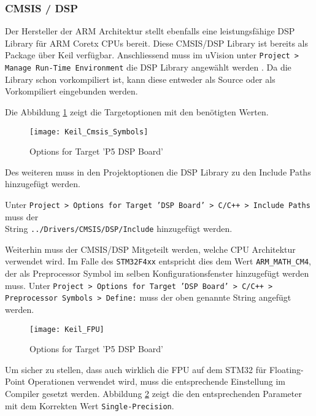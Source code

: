 \subsubsection{CMSIS / DSP}
\label{sec:CMSISDSP}

Der Hersteller der ARM Architektur stellt ebenfalls eine leistungsfähige DSP Library für ARM Coretx CPUs bereit.
Diese CMSIS/DSP Library ist bereits als Package über Keil verfügbar.
Anschliessend muss im uVision unter \texttt{Project > Manage Run-Time Environment} die DSP Library angewählt werden \cite{enable-cmsis-dsp-lib}.
Da die Library schon vorkompiliert ist, kann diese entweder als Source oder als Vorkompiliert eingebunden werden.

Die Abbildung \ref{pic:Keil_Cmsis_Symbols} zeigt die Targetoptionen mit den benötigten Werten.

\begin{figure}[H]
	\centering
	\texttt{[image: Keil\_Cmsis\_Symbols]}
	\caption{Options for Target 'P5 DSP Board'}
	\label{pic:Keil_Cmsis_Symbols}
\end{figure}

Des weiteren muss in den Projektoptionen die DSP Library zu den Include Paths hinzugefügt werden.

Unter \texttt{Project > Options for Target 'DSP Board' > C/C++ > Include Paths} muss der \\
String \texttt{../Drivers/CMSIS/DSP/Include} hinzugefügt werden.

Weiterhin muss der CMSIS/DSP Mitgeteilt werden, welche CPU Architektur verwendet wird. Im Falle des \texttt{STM32F4xx} entspricht dies dem Wert \texttt{ARM\_MATH\_CM4}, der als Preprocessor Symbol im selben Konfigurationsfenster hinzugefügt werden muss.
Unter \texttt{Project > Options for Target 'DSP Board' > C/C++ > Preprocessor Symbols > Define:} muss der oben genannte String angefügt werden.


\begin{figure}[H]
	\centering
	\texttt{[image: Keil\_FPU]}
	\caption{Options for Target 'P5 DSP Board'}
	\label{pic:Keil_FPU}
\end{figure}

Um sicher zu stellen, dass auch wirklich die FPU auf dem STM32 für Floating-Point Operationen verwendet wird, muss die entsprechende Einstellung im Compiler gesetzt werden.
Abbildung \ref{pic:Keil_FPU} zeigt die den entsprechenden Parameter mit dem Korrekten Wert \texttt{Single-Precision}.






